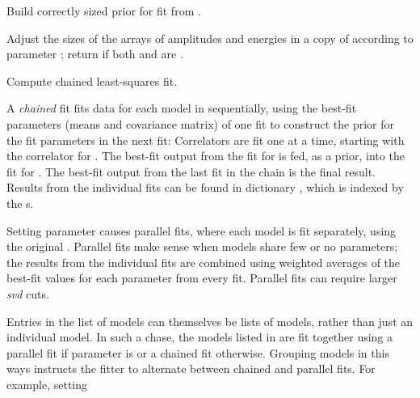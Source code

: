 \documentclass[letterpaper,10pt,english]{sphinxmanual}
\begin{document}
\begin{fulllineitems}
\begin{fulllineitems}
\end{fulllineitems}


\begin{fulllineitems}
\label{corrfitter:corrfitter.CorrFitter.buildprior}
Build correctly sized prior for fit from .

Adjust the sizes of the arrays of  amplitudes and energies in
a copy of  according to  parameter ; return
 if both  and  are .

\end{fulllineitems}


\begin{fulllineitems}
\label{corrfitter:corrfitter.CorrFitter.chained_lsqfit}
Compute chained least-squares fit.

A \emph{chained} fit fits data for each model in 
sequentially, using the best-fit parameters (means and
covariance matrix) of one fit to construct the prior for the
fit parameters in the  next fit: Correlators are fit one at a
time, starting with the correlator for . The
best-fit output from the fit for  is fed, as
a prior, into the fit for . The best-fit
output from  the last fit in the chain is the final result.
Results from the individual fits can be found in dictionary
, which is indexed  by the
s.

Setting parameter  causes parallel fits, where
each model is fit separately, using the original . Parallel
fits make sense when models share few or no parameters; the results
from the individual fits are combined using weighted averages of 
the best-fit values for each parameter from every fit. Parallel 
fits can require larger \emph{svd} cuts.

Entries  in the list of models can themselves  be
lists of models, rather than just an individual model. In such a
chase, the models listed in  are fit together using
a parallel fit if parameter  is  or a chained fit
otherwise. Grouping models in this ways instructs the fitter to
alternate between chained and parallel fits. For example, setting


\end{fulllineitems}
\end{fulllineitems}
\end{document}
